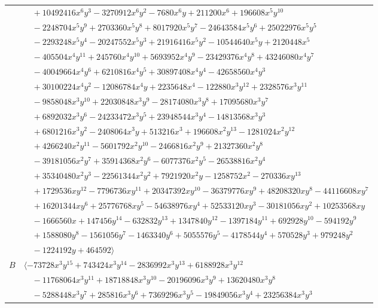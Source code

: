 \documentclass[11pt]{article}
\begin{document}
\begin{longtable}{@{}ll@{}}
 & $\quad +10492416x^{6}y^{3}-3270912x^{6}y^{2}-7680x^{6}y+211200x^{6}+196608x^{5}y^{10}$\\
 & $\quad -2248704x^{5}y^{9}+2703360x^{5}y^{8}+8017920x^{5}y^{7}-24643584x^{5}y^{6}+25022976x^{5}y^{5}$\\
 & $\quad -2293248x^{5}y^{4}-20247552x^{5}y^{3}+21916416x^{5}y^{2}-10544640x^{5}y+2120448x^{5}$\\
 & $\quad -405504x^{4}y^{11}+245760x^{4}y^{10}+5693952x^{4}y^{9}-23429376x^{4}y^{8}+43246080x^{4}y^{7}$\\
 & $\quad -40049664x^{4}y^{6}+6210816x^{4}y^{5}+30897408x^{4}y^{4}-42658560x^{4}y^{3}$\\
 & $\quad +30100224x^{4}y^{2}-12086784x^{4}y+2235648x^{4}-122880x^{3}y^{12}+2328576x^{3}y^{11}$\\
 & $\quad -9858048x^{3}y^{10}+22030848x^{3}y^{9}-28174080x^{3}y^{8}+17095680x^{3}y^{7}$\\
 & $\quad +6892032x^{3}y^{6}-24233472x^{3}y^{5}+23948544x^{3}y^{4}-14813568x^{3}y^{3}$\\
 & $\quad +6801216x^{3}y^{2}-2408064x^{3}y+513216x^{3}+196608x^{2}y^{13}-1281024x^{2}y^{12}$\\
 & $\quad +4266240x^{2}y^{11}-5601792x^{2}y^{10}-2466816x^{2}y^{9}+21327360x^{2}y^{8}$\\
 & $\quad -39181056x^{2}y^{7}+35914368x^{2}y^{6}-6077376x^{2}y^{5}-26538816x^{2}y^{4}$\\
 & $\quad +35340480x^{2}y^{3}-22561344x^{2}y^{2}+7921920x^{2}y-1258752x^{2}-270336xy^{13}$\\
 & $\quad +1729536xy^{12}-7796736xy^{11}+20347392xy^{10}-36379776xy^{9}+48208320xy^{8}-44116608xy^{7}$\\
 & $\quad +16201344xy^{6}+25776768xy^{5}-54638976xy^{4}+52533120xy^{3}-30181056xy^{2}+10253568xy$\\
 & $\quad -1666560x+147456y^{14}-632832y^{13}+1347840y^{12}-1397184y^{11}+692928y^{10}-594192y^{9}$\\
 & $\quad +1588080y^{8}-1561056y^{7}-1463340y^{6}+5055576y^{5}-4178544y^{4}+570528y^{3}+979248y^{2}$\\
 & $\quad -1224192y+464592\rangle$\\
$B$ & $\langle -73728x^{3}y^{15}+743424x^{3}y^{14}-2836992x^{3}y^{13}+6188928x^{3}y^{12}$\\
 & $\quad -11768064x^{3}y^{11}+18718848x^{3}y^{10}-20196096x^{3}y^{9}+13620480x^{3}y^{8}$\\
 & $\quad -5288448x^{3}y^{7}+285816x^{3}y^{6}+7369296x^{3}y^{5}-19849056x^{3}y^{4}+23256384x^{3}y^{3}$\\

\end{longtable}
\end{document}
